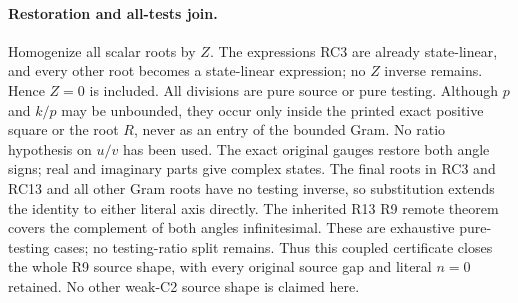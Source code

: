 \paragraph{Restoration and all-tests join.}
Homogenize all scalar roots by $Z$. The expressions RC3 are already
state-linear, and every other root becomes a state-linear expression;
no $Z$ inverse remains. Hence $Z=0$ is included. All divisions are
pure source or pure testing. Although $p$ and $k/p$ may be unbounded,
they occur only inside the printed exact positive square or the root
$R$, never as an entry of the bounded Gram. No ratio hypothesis on
$u/v$ has been used. The exact original gauges restore both
angle signs; real and imaginary parts give complex states. The final roots in RC3 and RC13 and all other Gram roots have no
testing inverse, so substitution extends the identity to either literal
axis directly. The inherited R13 R9 remote theorem covers the complement
of both angles infinitesimal.
These are exhaustive pure-testing cases; no testing-ratio split remains.
Thus this coupled certificate closes the whole R9 source shape,
with every original source gap and literal $n=0$ retained. No other
weak-C2 source shape is claimed here.
